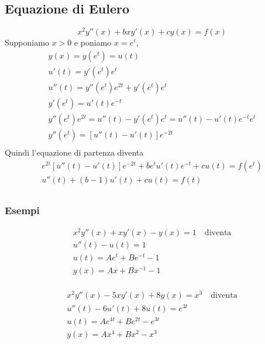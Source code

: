 \documentclass[10pt,a4paper,fleqn]{article}
\begin{document}
    \subsection*{Equazione di Eulero}
    \[
        x^2 y''(x)+ bxy'(x) + cy(x) = f(x)
    \]
    Supponiamo $x>0$ e poniamo $x=e^t$,
    \begin{multline*}
        y(x)=y(e^t)=u(t)\\
        u'(t)=y'(e^t)e^t\\
        u''(t)=y''(e^t)e^{2t}+y'(e^t)e^t\\
        y'(e^t)=u'(t)e^{-t}\\
        y''(e^t)e^{2t}=u''(t)-y'(e^t)e^t=u''(t)-u'(t)e^{-t}e^t\\
        y''(e^t)=\left[u''(t)-u'(t)\right]e^{-2t}\\
    \end{multline*}
    Quindi l'equazione di partenza diventa
    \begin{multline*}
        e^{2t}\left[u''(t)-u'(t)\right]e^{-2t}+be^tu'(t)e^{-t}+cu(t)=f(e^t)\\
        u''(t)+(b-1)u'(t)+cu(t)=f(t)\\
    \end{multline*}
    \subsubsection*{Esempi}
    \begin{minipage}{0.5\textwidth} 
        \begin{multline*}
            x^2 y''(x) + xy'(x)-y(x)=1 \quad\text{diventa}\\
            u''(t)-u(t)=1\\
            u(t)=Ae^t+Be^{-t}-1\\
            y(x)=Ax+Bx^{-1}-1\\
        \end{multline*}
    \end{minipage}
    \begin{minipage}{0.5\textwidth} 
        \begin{multline*}
            x^2 y''(x) -5xy'(x) + 8y(x)=x^3 \quad\text{diventa}\\
            u''(t)-6u'(t) + 8u(t)= e^{3t}\\
            u(t)=Ae^{4t}+Be^{2t}-e^{3t}\\
            y(x)=Ax^4+Bx^2-x^3\\
        \end{multline*}
    \end{minipage}
\end{document}
